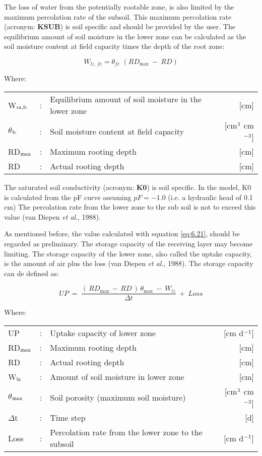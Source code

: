 The loss of water from the potentially rootable zone, is also limited by the maximum
percolation rate of the subsoil. This maximum percolation rate (acronym: {\bf KSUB}) is soil
specific and should be provided by the user. The equilibrium amount of soil moisture in
the lower zone can be calculated as the soil moisture content at field capacity times the
depth of the root zone:

\begin{equation}
\label{eq:6.24}
W_{lz,\, fc} = \theta_{fc} \,\, (RD_{\max} ~-~RD)
\end{equation}

Where:\\[5pt]
\begin{tabularx}{\textwidth}{llXr}
	W$_{{\rm rz,fc}}$ &:& Equilibrium amount of soil moisture in the lower zone  & [cm]\\
	$\theta$$_{{\rm fc}}$ &:& Soil moisture content at field capacity  & [cm$^{{\rm 3}}$ cm$^{{\rm -3}}$]\\
	RD$_{{\rm max}}$ &:& Maximum rooting depth  & [cm]\\
	RD &:& Actual rooting depth  & [cm]\\
\end{tabularx}

The saturated soil conductivity (acronym: {\bf K0}) is soil specific. In the
model, K0 is calculated from the pF curve assuming $pF = -1.0$ (i.e. a hydraulic head of 0.1
cm) The percolation rate from the lower zone to the sub soil is not to exceed this value
(van Diepen {\it et al}., 1988). 

As mentioned before, the value calculated with equation \ref{eq:6.21}, should be regarded as
preliminary. The storage capacity of the receiving layer may become limiting. The
storage capacity of the lower zone, also called the uptake capacity, is the amount of air
plus the loss (van Diepen {\it et al}., 1988). The storage capacity can de defined as:

\begin{equation}
\label{eq:6.25}
UP  ~=~{\frac{(\, RD _{\max } \, -\, RD\, )\, \theta  _{\max } ~-~ W _{lz} }{\Delta t}} ~+~ Loss
\end{equation}

Where:\\[5pt]
\begin{tabularx}{\textwidth}{llXr}
	UP &:& Uptake capacity of lower zone  & [cm d$^{{\rm -1}}$]\\
	RD$_{{\rm max}}$ &:& Maximum rooting depth  & [cm]\\
	RD &:& Actual rooting depth  & [cm]\\
	W$_{{\rm lz}}$ &:& Amount of soil moisture in lower zone  & [cm]\\
	$\theta$$_{{\rm max}}$ &:& Soil porosity (maximum soil moisture)  & [cm$^{{\rm 3}}$ cm$^{{\rm -3}}$]\\
	$\Delta$t &:& Time step  & [d]\\
	Loss &:& Percolation rate from the lower zone to the subsoil   & [cm d$^{{\rm -1}}$]\\
\end{tabularx}

